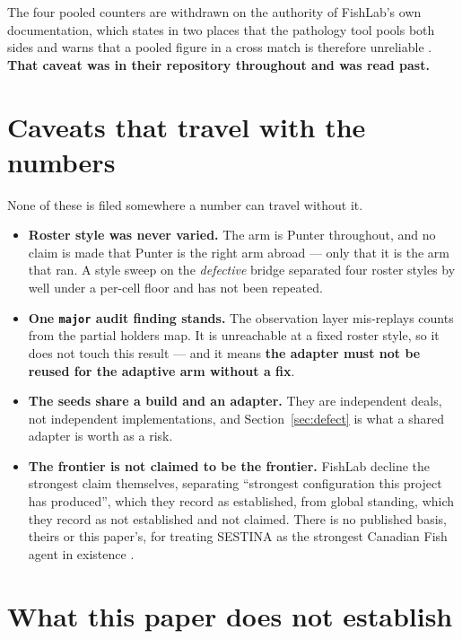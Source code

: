 \documentclass[11pt]{article}
\newcommand{\code}[1]{\texttt{#1}}
\begin{document}
The four pooled counters are withdrawn on the authority of FishLab's own documentation, which states
in two places that the pathology tool pools both sides and warns that a pooled figure in a cross
match is therefore unreliable \cite{fishlab}. \textbf{That caveat was in their repository throughout
and was read past.}

\section{Caveats that travel with the numbers}
\label{sec:caveats}

None of these is filed somewhere a number can travel without it.

\begin{itemize}
\item \textbf{Roster style was never varied.} The arm is Punter throughout, and no claim is made
that Punter is the right arm abroad --- only that it is the arm that ran. A style sweep on the
\emph{defective} bridge separated four roster styles by well under a per-cell floor and has not been
repeated.
\item \textbf{One \code{major} audit finding stands.} The observation layer mis-replays counts from
the partial holders map. It is unreachable at a fixed roster style, so it does not touch this
result --- and it means \textbf{the adapter must not be reused for the adaptive arm without a fix}.
\item \textbf{The seeds share a build and an adapter.} They are independent deals, not independent
implementations, and Section~\ref{sec:defect} is what a shared adapter is worth as a risk.
\item \textbf{The frontier is not claimed to be the frontier.} FishLab decline the strongest claim
themselves, separating ``strongest configuration this project has produced'', which they record as
established, from global standing, which they record as not established and not claimed. There is no
published basis, theirs or this paper's, for treating SESTINA as the strongest Canadian Fish agent
in existence \cite{fishlab}.
\end{itemize}

\section{What this paper does not establish}
\label{sec:notestablish}
\end{document}
